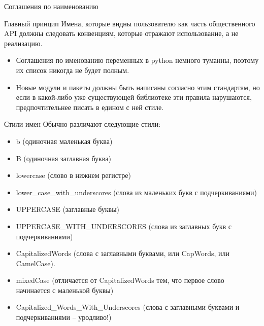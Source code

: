 \documentclass[xcolor=table]{beamer}
\begin{document}
\begin{frame}[fragile]{Соглашения по наименованию}
	\begin{block}{Главный принцип}
		Имена, которые видны пользователю как часть общественного API должны следовать конвенциям, которые отражают использование, а не реализацию.	
	\end{block}
	\begin{itemize}
		\item Соглашения по именованию переменных в python немного туманны, поэтому их список никогда не будет полным.
		\item Новые модули и пакеты должны быть написаны согласно этим стандартам, но если в какой-либо уже существующей библиотеке эти правила нарушаются, предпочтительнее писать в едином с ней стиле. 
	\end{itemize}
\end{frame}

\begin{frame}[fragile]{Стили имен}
	Обычно различают следующие стили:
	\begin{itemize}
		\item b (одиночная маленькая буква)
		\item B (одиночная заглавная буква)
		\item lowercase (слово в нижнем регистре)
		\item lower\_case\_with\_underscores (слова из маленьких букв с подчеркиваниями)
		\item UPPERCASE (заглавные буквы)
		\item UPPERCASE\_WITH\_UNDERSCORES (слова из заглавных букв с подчеркиваниями)
		\item CapitalizedWords (слова с заглавными буквами, или CapWords, или CamelCase). 			\item mixedCase (отличается от CapitalizedWords тем, что первое слово начинается с маленькой буквы)
		\item Capitalized\_Words\_With\_Underscores (слова с заглавными буквами и подчеркиваниями -- уродливо!)
	\end{itemize}	
\end{frame}
\end{document}
